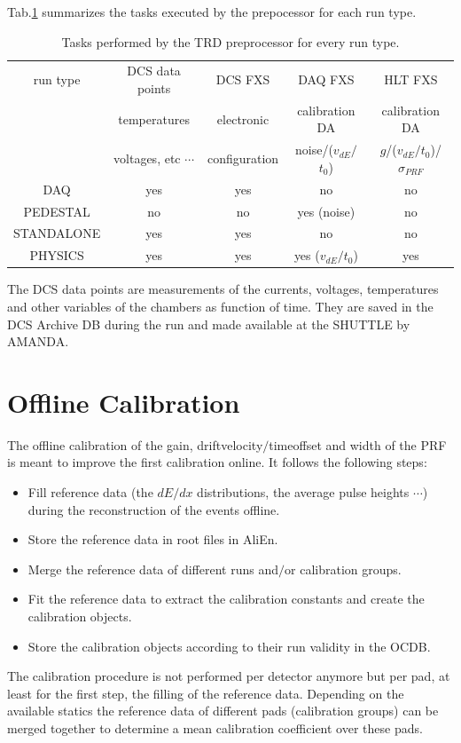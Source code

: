 \documentclass{alicetdr}
\begin{document}
Tab.\ref{taskruntype} summarizes the tasks executed by the prepocessor 
for each run type.
\begin{table}[h]
\begin{center}
\begin{tabular} {|c|c|c|c|c|}
\hline run type & DCS data points  & DCS FXS & DAQ FXS & HLT FXS  \\
 & temperatures  & electronic  & calibration DA  & calibration DA   \\
 & voltages, etc $\cdots$  &  configuration & noise/($v_{dE}$$/$$t_{0}$)  
& $g$/($v_{dE}$$/$$t_{0}$)/$\sigma_{PRF}$   \\
\hline DAQ   & yes & yes & no & no \\\hline
\hline PEDESTAL   & no & no & yes (noise) & no \\\hline
\hline STANDALONE & yes & yes & no & no \\\hline
\hline PHYSICS & yes & yes & yes ($v_{dE}$$/$$t_{0}$) & yes \\\hline
\end{tabular} 
\caption{\label{taskruntype} Tasks performed by the TRD preprocessor 
for every run type.} 
\end{center}
\end{table}
The DCS data points are measurements of the currents, voltages, 
temperatures and other variables of the chambers as function of time. 
They are saved in the DCS Archive DB during the run and made available 
at the SHUTTLE by AMANDA.
%
\section{Offline Calibration}
The offline calibration of the gain, driftvelocity$/$timeoffset and 
width of the PRF is meant to improve the first calibration online. 
It follows the following steps:
\begin{itemize}
\item Fill reference data (the $dE/dx$ distributions, the average 
pulse heights $\cdots$) during the reconstruction of the events offline.
\item Store the reference data in root files in AliEn.
\item Merge the reference data of different runs and$/$or calibration groups.
\item Fit the reference data to extract the calibration constants and 
create the calibration objects.
\item Store the calibration objects according to their run validity in 
the OCDB.
\end{itemize}
The calibration procedure is not performed per detector anymore but per 
pad, at least for the first step, the filling of the reference data. 
Depending on the available statics the reference data of different pads 
(calibration groups) can be merged together to determine a mean 
calibration coefficient over these pads.
\end{document}

